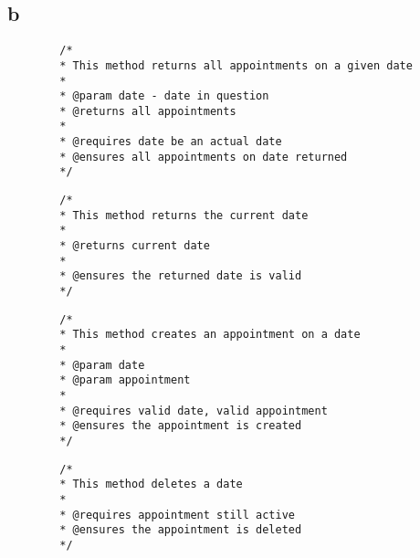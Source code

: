\documentclass{article}
\begin{document}
    \subsection*{b}
    \begin{verbatim}
        /*
        * This method returns all appointments on a given date
        *
        * @param date - date in question
        * @returns all appointments
        *
        * @requires date be an actual date
        * @ensures all appointments on date returned
        */
    \end{verbatim}
    \begin{verbatim}
        /*
        * This method returns the current date
        *
        * @returns current date
        *
        * @ensures the returned date is valid
        */
    \end{verbatim}
    \begin{verbatim}
        /*
        * This method creates an appointment on a date
        *
        * @param date
        * @param appointment
        *
        * @requires valid date, valid appointment
        * @ensures the appointment is created
        */
    \end{verbatim}
    \begin{verbatim}
        /*
        * This method deletes a date
        *
        * @requires appointment still active
        * @ensures the appointment is deleted
        */
    \end{verbatim}
\end{document}
